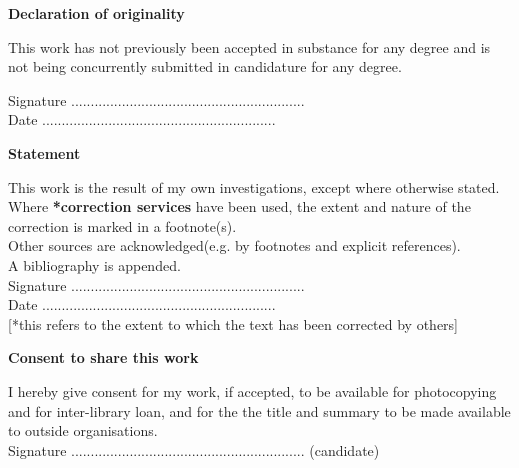 \thispagestyle{empty}

\begin{center}
    {\LARGE\bf Declaration of originality}
\end{center}

This work has not previously been accepted in substance for any degree and is not being concurrently submitted in candidature for any degree.

\vspace{3em}
Signature ............................................................ \\

\vspace{1em}
Date ............................................................ \\

\begin{center}
    {\LARGE\bf Statement}
\end{center}
This work is the result of my own investigations, except where otherwise stated. 
Where \textbf{*correction services} have been used, the extent and nature of the correction is marked in a footnote(s).\\

Other sources are acknowledged(e.g. by footnotes and explicit references).\\
A bibliography is appended.\\

\vspace{3em}
Signature ............................................................  \\

\vspace{1em}
Date ............................................................ \\

[*this refers to the extent to which the text has been corrected by others]\\

\begin{center}
    {\LARGE\bf Consent to share this work}
\end{center}
I hereby give consent for my work, if accepted, to be available for photocopying and for inter-library loan, and for the the title and summary to be made available to outside organisations.\\

\vspace{3em}
Signature ............................................................  (candidate)\\

